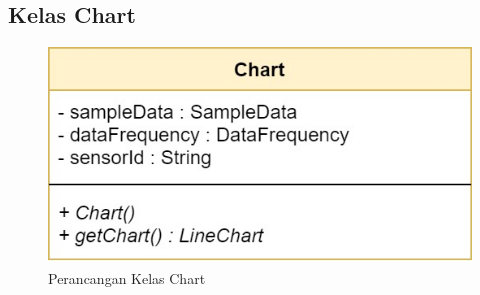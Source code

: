 \subsection{Kelas Chart}
\begin{figure}[H] 
	\centering  
	\includegraphics[scale=0.35]{Gambar/Controller_Charts.jpg}
	\caption[Perancangan Kelas Chart]{Perancangan Kelas Chart}
	\label{fig:controller_chart} 
\end{figure}


